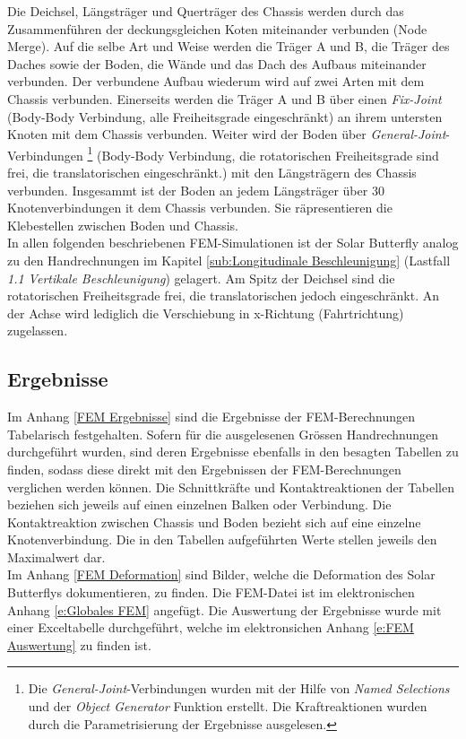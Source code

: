 Die Deichsel, Längsträger und Querträger des Chassis werden durch das Zusammenführen der deckungsgleichen Koten miteinander verbunden (Node Merge). Auf die selbe Art und Weise werden die Träger A und B, die Träger des Daches sowie der Boden, die Wände und das Dach des Aufbaus miteinander verbunden. Der verbundene Aufbau wiederum wird auf zwei Arten mit dem Chassis verbunden. Einerseits werden die Träger A und B über einen \emph{Fix-Joint} (Body-Body Verbindung, alle Freiheitsgrade eingeschränkt) an ihrem untersten Knoten mit dem Chassis verbunden. Weiter wird der Boden über \emph{General-Joint}-Verbindungen%
\footnote{Die \emph{General-Joint}-Verbindungen wurden mit der Hilfe von \emph{Named Selections} und der \emph{Object Generator} Funktion erstellt. Die Kraftreaktionen wurden durch die Parametrisierung der Ergebnisse ausgelesen.}
(Body-Body Verbindung, die rotatorischen Freiheitsgrade sind frei, die translatorischen eingeschränkt.) mit den Längsträgern des Chassis verbunden. Insgesammt ist der Boden an jedem Längsträger über 30 Knotenverbindungen it dem Chassis verbunden. Sie räpresentieren die Klebestellen zwischen Boden und Chassis.\\
In allen folgenden beschriebenen FEM-Simulationen ist der Solar Butterfly analog zu den Handrechnungen im Kapitel \ref{sub:Longitudinale Beschleunigung} (Lastfall \emph{1.1 Vertikale Beschleunigung}) gelagert. Am Spitz der Deichsel sind die rotatorischen Freiheitsgrade frei, die translatorischen jedoch eingeschränkt. An der Achse wird lediglich die Verschiebung in x-Richtung (Fahrtrichtung) zugelassen.


\subsection{Ergebnisse}
Im Anhang \ref{FEM Ergebnisse} sind die Ergebnisse der FEM-Berechnungen Tabelarisch festgehalten. Sofern für die ausgelesenen Grössen Handrechnungen durchgeführt wurden, sind deren Ergebnisse ebenfalls in den besagten Tabellen zu finden, sodass diese direkt mit den Ergebnissen der FEM-Berechnungen verglichen werden können. Die Schnittkräfte und Kontaktreaktionen der Tabellen beziehen sich jeweils auf einen einzelnen Balken oder Verbindung. Die Kontaktreaktion zwischen Chassis und Boden bezieht sich auf eine einzelne Knotenverbindung. Die in den Tabellen aufgeführten Werte stellen jeweils den Maximalwert dar.\\
Im Anhang \ref{FEM Deformation} sind Bilder, welche die Deformation des Solar Butterflys dokumentieren, zu finden. Die FEM-Datei ist im elektronischen Anhang \ref{e:Globales FEM} angefügt. Die Auswertung der Ergebnisse wurde mit einer Exceltabelle durchgeführt, welche im elektronsichen Anhang \ref{e:FEM Auswertung} zu finden ist.

